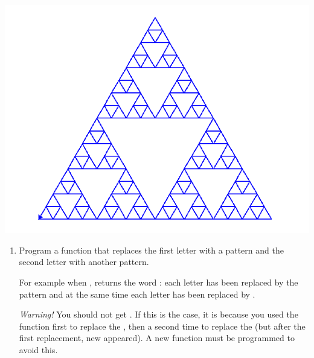 \documentclass[11pt,class=report,crop=false]{standalone}
\begin{document}
\begin{activite}



\begin{center}	
\includegraphics[scale=\myscale,scale=0.35]{screen-lsystems-7e}
\end{center}

\begin{enumerate}
  \item Program a  function that replaces the first letter with a pattern and the second letter with another pattern. 

For example when ,  returns the word : each letter  has been replaced by the pattern  and at the same time each letter  has been replaced by .

\emph{Warning!} You should not get . If this is the case, it is because you used the  function first to replace the , then a second time to replace the  (but after the first replacement, new  appeared). A new function must be programmed to avoid this. 


\end{enumerate}
\end{activite}
\end{document}
